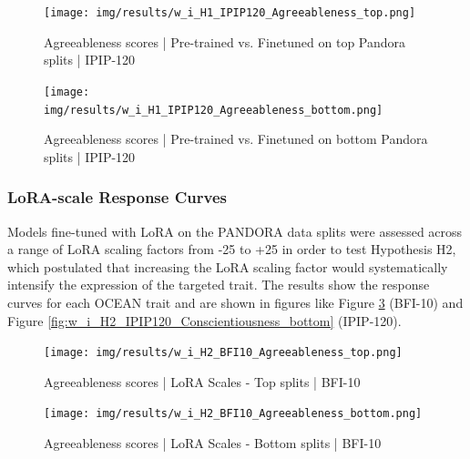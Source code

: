 \documentclass{DESSThesis}
\begin{document}
\begin{figure}[H]
    \centering
    \texttt{[image: img/results/w\_i\_H1\_IPIP120\_Agreeableness\_top.png]}
    \caption{Agreeableness scores | Pre-trained vs. Finetuned on top Pandora splits | IPIP-120}
    \label{fig:w_i_H1_IPIP120_Agreeableness_top}
\end{figure}

\begin{figure}[H]
    \centering
    \texttt{[image: img/results/w\_i\_H1\_IPIP120\_Agreeableness\_bottom.png]}
    \caption{Agreeableness scores | Pre-trained vs. Finetuned on bottom Pandora splits | IPIP-120}
    \label{fig:w_i_H1_IPIP120_Agreeableness_bottom}
\end{figure}

\subsubsection{LoRA-scale Response Curves}
Models fine-tuned with LoRA on the PANDORA data splits were assessed across a range of LoRA scaling factors from -25 to +25 in order to test Hypothesis H2, which postulated that increasing the LoRA scaling factor would systematically intensify the expression of the targeted trait. The results show the response curves for each OCEAN trait and are shown in figures like Figure \ref{fig:w_i_H2_BFI10_Agreeableness_top} (BFI-10) and Figure \ref{fig:w_i_H2_IPIP120_Conscientiousness_bottom} (IPIP-120).
\\
\begin{figure}[H]
    \centering
    \texttt{[image: img/results/w\_i\_H2\_BFI10\_Agreeableness\_top.png]}
    \caption{Agreeableness scores | LoRA Scales - Top splits | BFI-10}
    \label{fig:w_i_H2_BFI10_Agreeableness_top}
\end{figure}

\begin{figure}[H]
    \centering
    \texttt{[image: img/results/w\_i\_H2\_BFI10\_Agreeableness\_bottom.png]}
    \caption{Agreeableness scores | LoRA Scales - Bottom splits | BFI-10}
    \label{fig:w_i_H2_BFI10_Agreeableness_bottom}
\end{figure}
\end{document}
